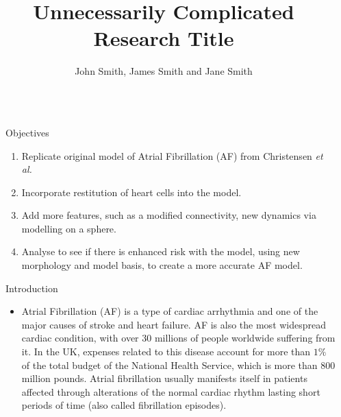 \documentclass[final,hyperref={pdfpagelabels=false}]{beamer}
\title{\huge Unnecessarily Complicated Research Title} %
\author{John Smith, James Smith and Jane Smith} %
\institute{Department and University Name} %
\begin{document}

\begin{frame}[t] %

\begin{columns}[t] %

\begin{column}{.02\textwidth}\end{column} %

\begin{column}{.465\textwidth} %


\begin{block}{Objectives}

\begin{enumerate}
\item Replicate original model of Atrial Fibrillation (AF) from Christensen \emph{et al.}
\item Incorporate restitution of heart cells into the model. 
\item Add more features, such as a modified connectivity, new dynamics via modelling on a sphere. 
\item Analyse to see if there is enhanced risk with the model, using new morphology and model basis, to create a more accurate AF model.
\end{enumerate}

\end{block}

            
\begin{block}{Introduction}

\begin{itemize}
\item Atrial Fibrillation (AF) is a type of cardiac arrhythmia and one of the major causes of stroke and heart failure. AF is also the most widespread cardiac condition, with over 30 millions of people worldwide suffering from it. In the UK, expenses related to this disease account for more than $1\%$ of the total budget of the National Health Service, which is more than $800$ million pounds. Atrial fibrillation usually manifests itself in patients affected through alterations of the normal cardiac rhythm lasting short periods of time (also called fibrillation episodes).\\
\end{itemize}



\end{block}
\end{column}
\end{columns}
\end{frame}
\end{document}
